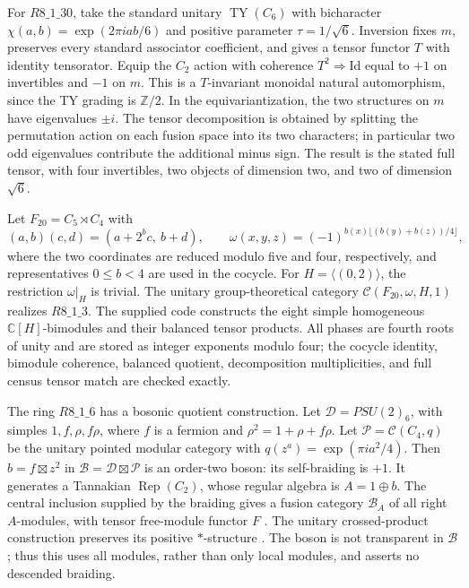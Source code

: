 \documentclass[11pt,reqno]{amsart}
\theoremstyle{definition}
\theoremstyle{remark}
\newcommand{\C}{\mathbb C}
\newcommand{\Z}{\mathbb Z}
\newcommand{\Rep}{\operatorname{Rep}}
\begin{document}
For $R8\_1\_30$, take the standard unitary $\operatorname{TY}(C_6)$ with bicharacter $\chi(a,b)=\exp(2\pi iab/6)$ and positive parameter $\tau=1/\sqrt6$. Inversion fixes $m$, preserves every standard associator coefficient, and gives a tensor functor $T$ with identity tensorator. Equip the $C_2$ action with coherence $T^2\Rightarrow\mathrm{Id}$ equal to $+1$ on invertibles and $-1$ on $m$. This is a $T$-invariant monoidal natural automorphism, since the TY grading is $\Z/2$. In the equivariantization, the two structures on $m$ have eigenvalues $\pm i$. The tensor decomposition is obtained by splitting the permutation action on each fusion space into its two characters; in particular two odd eigenvalues contribute the additional minus sign. The result is the stated full tensor, with four invertibles, two objects of dimension two, and two of dimension $\sqrt6$.

Let $F_{20}=C_5\rtimes C_4$ with
\[
(a,b)(c,d)=(a+2^bc,\ b+d),\qquad
\omega(x,y,z)=(-1)^{b(x)\lfloor(b(y)+b(z))/4\rfloor},
\]
where the two coordinates are reduced modulo five and four, respectively, and representatives $0\le b<4$ are used in the cocycle. For $H=\langle(0,2)\rangle$, the restriction $\omega|_H$ is trivial. The unitary group-theoretical category $\mathcal C(F_{20},\omega,H,1)$ realizes $R8\_1\_3$. The supplied code constructs the eight simple homogeneous $\C[H]$-bimodules and their balanced tensor products. All phases are fourth roots of unity and are stored as integer exponents modulo four; the cocycle identity, bimodule coherence, balanced quotient, decomposition multiplicities, and full census tensor match are checked exactly.


The ring $R8\_1\_6$ has a bosonic quotient construction. Let $\mathcal D=PSU(2)_6$, with simples $1,f,\rho,f\rho$, where $f$ is a fermion and $\rho^2=1+\rho+f\rho$. Let $\mathcal P=\mathcal C(C_4,q)$ be the unitary pointed modular category with $q(z^a)=\exp(\pi i a^2/4)$. Then $b=f\boxtimes z^2$ in $\mathcal B=\mathcal D\boxtimes\mathcal P$ is an order-two boson: its self-braiding is $+1$. It generates a Tannakian $\Rep(C_2)$, whose regular algebra is $A=1\oplus b$. The central inclusion supplied by the braiding gives a fusion category $\mathcal B_A$ of all right $A$-modules, with tensor free-module functor $F$ \cite[Theorems~8.4.9 and~8.23.3]{EGNO}. The unitary crossed-product construction preserves its positive $*$-structure \cite{Muger}. The boson is not transparent in $\mathcal B$; thus this uses all modules, rather than only local modules, and asserts no descended braiding.
\end{document}
